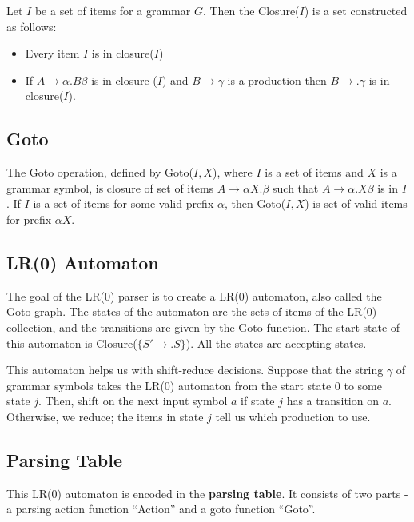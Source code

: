 \documentclass[12pt,letterpaper]{amsbook}
\theoremstyle{definition}
\begin{document}
Let $I$ be a set of items for a grammar $G$. Then the Closure($I$) is a set constructed as follows:

\begin{itemize}
  \item Every item $I$ is in closure($I$)
  \item If $A \rightarrow \alpha . B \beta$ is in closure ($I$) and $B \rightarrow \gamma$ is a production then $B \rightarrow .\gamma$ is in closure($I$).
\end{itemize}

\subsection{Goto}

The Goto operation, defined by Goto($I,X$), where $I$ is a set of items and $X$ is a grammar symbol, is closure of set of items $A \rightarrow \alpha X. \beta$ such that $A \rightarrow \alpha . X \beta$ is in $I$. If $I$ is a set of items for some valid prefix $\alpha$, then Goto($I,X$) is set of valid items for prefix $\alpha X$. 

\subsection{LR(0) Automaton}

The goal of the LR(0) parser is to create a LR(0) automaton, also called the Goto graph. The states of the automaton are the sets of items of the LR(0) collection, and the transitions are given by the Goto function. The start state of this automaton is Closure($\{S' \rightarrow .S\}$). All the states are accepting states.

This automaton helps us with shift-reduce decisions. Suppose that the string $\gamma$ of grammar symbols takes the LR(0) automaton from the start state 0 to some state $j$. Then, shift on the next input symbol $a$ if state $j$ has a transition on $a$. Otherwise, we reduce; the items in state $j$ tell us which production to use.

\subsection{Parsing Table}

This LR(0) automaton is encoded in the \textbf{parsing table}. It consists of two parts - a parsing action function ``Action'' and a goto function ``Goto''.
\end{document}
